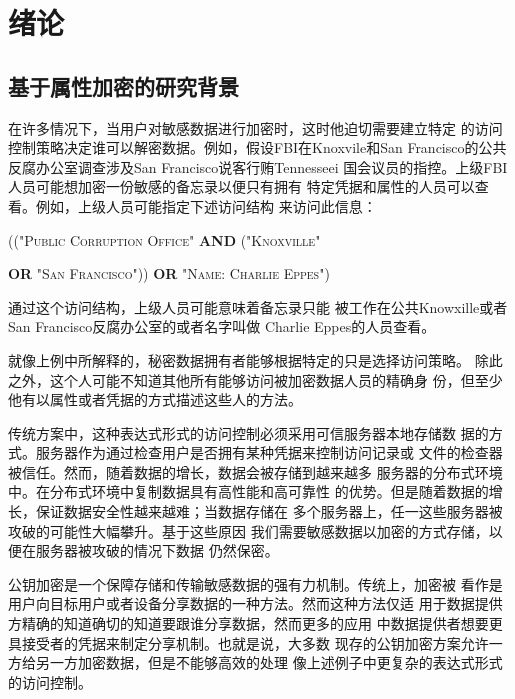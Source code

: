 \chapter{绪论}
\section{基于属性加密的研究背景}
在许多情况下，当用户对敏感数据进行加密时，这时他迫切需要建立特定
的访问控制策略决定谁可以解密数据。例如，假设FBI在Knoxvile和San
Francisco的公共反腐办公室调查涉及San Francisco说客行贿Tennesseei
国会议员的指控。上级FBI人员可能想加密一份敏感的备忘录以便只有拥有
特定凭据和属性的人员可以查看。例如，上级人员可能指定下述访问结构
来访问此信息：
\centerline{\textsc{(("Public Corruption Office" \textbf{AND} 
("Knoxville" }}
\centerline{\textsc{\textbf{OR} "San Francisco"))
\textbf{OR} "Name: Charlie Eppes")}} 
通过这个访问结构，上级人员可能意味着备忘录只能
被工作在公共Knowxille或者San Francisco反腐办公室的或者名字叫做
Charlie Eppes的人员查看。\par
就像上例中所解释的，秘密数据拥有者能够根据特定的只是选择访问策略。
除此之外，这个人可能不知道其他所有能够访问被加密数据人员的精确身
份，但至少他有以属性或者凭据的方式描述这些人的方法。\par
传统方案中，这种表达式形式的访问控制必须采用可信服务器本地存储数
据的方式。服务器作为通过检查用户是否拥有某种凭据来控制访问记录或
文件的检查器被信任。然而，随着数据的增长，数据会被存储到越来越多
服务器的分布式环境中。在分布式环境中复制数据具有高性能和高可靠性
的优势。但是随着数据的增长，保证数据安全性越来越难；当数据存储在
多个服务器上，任一这些服务器被攻破的可能性大幅攀升。基于这些原因
我们需要敏感数据以加密的方式存储，以便在服务器被攻破的情况下数据
仍然保密。\par
公钥加密是一个保障存储和传输敏感数据的强有力机制。传统上，加密被
看作是用户向目标用户或者设备分享数据的一种方法。然而这种方法仅适
用于数据提供方精确的知道确切的知道要跟谁分享数据，然而更多的应用
中数据提供者想要更具接受者的凭据来制定分享机制。也就是说，大多数
现存的公钥加密方案允许一方给另一方加密数据，但是不能够高效的处理
像上述例子中更复杂的表达式形式的访问控制。\par
